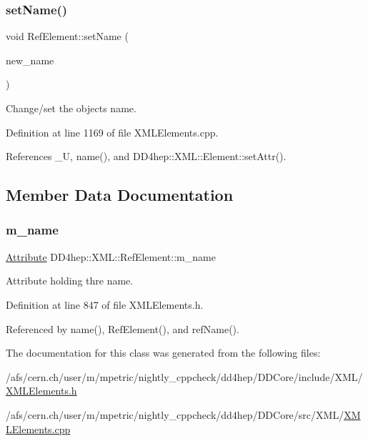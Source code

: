 \subsubsection{\texorpdfstring{set\+Name()}{setName()}}
{\footnotesize\ttfamily void Ref\+Element\+::set\+Name (\begin{DoxyParamCaption}\item[{const \hyperlink{namespace_d_d4hep_1_1_x_m_l_a09e5d9cc86ed782f6826dfe0778c1815}{Xml\+Char} $\ast$}]{new\+\_\+name }\end{DoxyParamCaption})}



Change/set the object\textquotesingle{}s name. 



Definition at line 1169 of file X\+M\+L\+Elements.\+cpp.



References \+\_\+U, name(), and D\+D4hep\+::\+X\+M\+L\+::\+Element\+::set\+Attr().



\subsection{Member Data Documentation}
\hypertarget{class_d_d4hep_1_1_x_m_l_1_1_ref_element_a581df5a2c94d0c6ed1bacce5e478928d}{}\label{class_d_d4hep_1_1_x_m_l_1_1_ref_element_a581df5a2c94d0c6ed1bacce5e478928d} 
\subsubsection{\texorpdfstring{m\+\_\+name}{m\_name}}
{\footnotesize\ttfamily \hyperlink{namespace_d_d4hep_1_1_x_m_l_a5c19b7116be99d69b4b22d911357baaf}{Attribute} D\+D4hep\+::\+X\+M\+L\+::\+Ref\+Element\+::m\+\_\+name}



Attribute holding thre name. 



Definition at line 847 of file X\+M\+L\+Elements.\+h.



Referenced by name(), Ref\+Element(), and ref\+Name().



The documentation for this class was generated from the following files\+:\begin{DoxyCompactItemize}
\item 
/afs/cern.\+ch/user/m/mpetric/nightly\+\_\+cppcheck/dd4hep/\+D\+D\+Core/include/\+X\+M\+L/\hyperlink{_x_m_l_elements_8h}{X\+M\+L\+Elements.\+h}\item 
/afs/cern.\+ch/user/m/mpetric/nightly\+\_\+cppcheck/dd4hep/\+D\+D\+Core/src/\+X\+M\+L/\hyperlink{_x_m_l_elements_8cpp}{X\+M\+L\+Elements.\+cpp}\end{DoxyCompactItemize}

